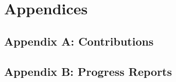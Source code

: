 \newcommand{\homedir}{/home/bscholtz/workspace/workspace-latex/templates/BasicTemplateUCT/}



\newcommand{\coursecode}{EEE4XXXX}
\newcommand{\assignment}{Assignment One}
\newcommand{\lecturer}{Prof. Ed Boje}

\pagestyle{fancy}
\fancyhf{}
\cfoot{\thepage}






\newpage
\tableofcontents



\newpage



\newpage





\newpage
\section*{Appendices}
\subsection*{Appendix A: Contributions}
\subsection*{Appendix B: Progress Reports}



